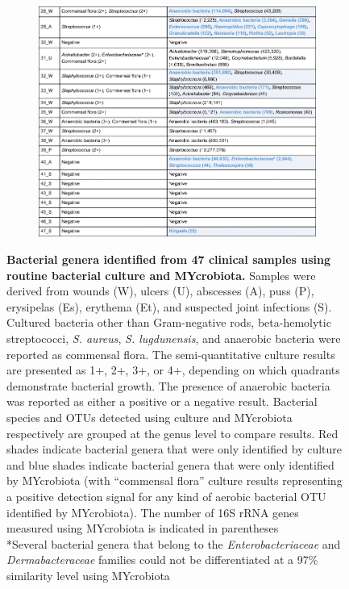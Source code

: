 \begin{figure}\ContinuedFloat
\begin{subfigure}{\textwidth}
 \centering
 \includegraphics[scale=0.6]{chapters/images/mycrobiota/mycrobiota-table1b.png}
\end{subfigure}
\caption{\textbf{Bacterial genera identified from 47 clinical samples using routine bacterial culture and MYcrobiota.} Samples were derived from wounds (W), ulcers (U), abscesses (A), puss (P), erysipelas (Es), erythema (Et), and suspected joint infections (S). Cultured bacteria other than Gram-negative rods, beta-hemolytic streptococci, \textit{S. aureus}, \textit{S. lugdunensis}, and anaerobic bacteria were reported as commensal flora. The semi-quantitative culture results are presented as 1+, 2+, 3+, or 4+, depending on which quadrants demonstrate bacterial growth. The presence of anaerobic bacteria was reported as either a positive or a negative result. Bacterial species and OTUs detected using culture and MYcrobiota respectively are grouped at the genus level to compare results. Red shades indicate bacterial genera that were only identified by culture and blue shades indicate bacterial genera that were only identified by MYcrobiota (with “commensal flora” culture results representing a positive detection signal for any kind of aerobic bacterial OTU identified by MYcrobiota). The number of 16S rRNA genes measured using MYcrobiota is indicated in parentheses \\ *Several bacterial genera that belong to the \textit{Enterobacteriaceae} and \textit{Dermabacteraceae} families could not be differentiated at a 97\% similarity level using MYcrobiota }
\label{table:samples}
\end{figure}

